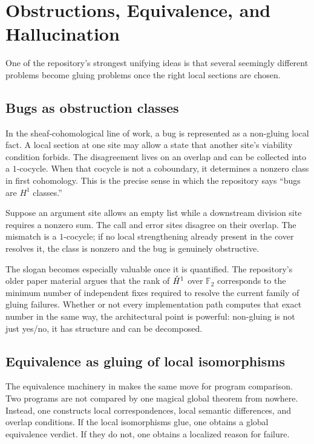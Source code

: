 \chapter{Obstructions, Equivalence, and Hallucination}

One of the repository's strongest unifying ideas is that several seemingly different
problems become gluing problems once the right local sections are chosen.

\section*{Bugs as obstruction classes}
In the sheaf-cohomological line of work, a bug is represented as a non-gluing local fact.
A local section at one site may allow a state that another site's viability condition
forbids. The disagreement lives on an overlap and can be collected into a $1$-cocycle.
When that cocycle is not a coboundary, it determines a nonzero class in first cohomology.
This is the precise sense in which the repository says ``bugs are $H^1$ classes.''

\begin{example}
Suppose an argument site allows an empty list while a downstream division site requires a
nonzero sum. The call and error sites disagree on their overlap. The mismatch is a
$1$-cocycle; if no local strengthening already present in the cover resolves it, the class
is nonzero and the bug is genuinely obstructive.
\end{example}

The slogan becomes especially valuable once it is quantified. The repository's older paper
material argues that the rank of $\check{H}^{1}$ over $\mathbb{F}_2$ corresponds to the minimum
number of independent fixes required to resolve the current family of gluing failures.
Whether or not every implementation path computes that exact number in the same way, the
architectural point is powerful: non-gluing is not just yes/no, it has structure and can
be decomposed.

\section*{Equivalence as gluing of local isomorphisms}
The equivalence machinery in  makes the same move for program
comparison. Two programs are not compared by one magical global theorem from nowhere.
Instead, one constructs local correspondences, local semantic differences, and overlap
conditions. If the local isomorphisms glue, one obtains a global equivalence verdict. If
they do not, one obtains a localized reason for failure.

